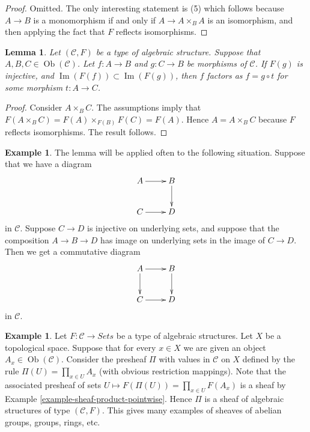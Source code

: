\documentclass{stacks-project}
\theoremstyle{plain}
\newtheorem{lemma}[subsection]{Lemma}
\theoremstyle{definition}
\newtheorem{example}[subsection]{Example}
\theoremstyle{remark}
\numberwithin{equation}{subsection}
\def\Ob{\mathop{\mathrm{Ob}}\nolimits}
\def\Im{\mathop{\mathrm{Im}}}
\begin{document}
\begin{proof}
Omitted. The only interesting statement is (5) which
follows because $A \to B$ is a monomorphism if and only if
$A \to A \times_B A$ is an isomorphism, and then applying
the fact that $F$ reflects isomorphisms.
\end{proof}

\begin{lemma}
\label{lemma-image-contained-in}
Let $(\mathcal{C}, F)$ be a type of algebraic structure.
Suppose that $A, B, C \in \Ob(\mathcal{C})$.
Let $f : A \to B$ and $g : C \to B$ be morphisms of
$\mathcal{C}$. If $F(g)$ is injective, and
$\Im(F(f)) \subset \Im(F(g))$, then
$f$ factors as $f = g \circ t$ for some morphism
$t : A \to C$.
\end{lemma}

\begin{proof}
Consider $A \times_B C$. The assumptions imply that
$F(A \times_B C) = F(A) \times_{F(B)} F(C) = F(A)$.
Hence $A = A \times_B C$ because $F$ reflects isomorphisms.
The result follows.
\end{proof}

\begin{example}
\label{example-application-lemma-image-contained-in}
The lemma will be applied often to the following situation.
Suppose that we have a diagram
$$
\xymatrix{
A \ar[r] & B \ar[d] \\
C \ar[r] & D
}
$$
in $\mathcal{C}$. Suppose $C \to D$ is injective on underlying
sets, and suppose that the composition $A \to B \to D$ has
image on underlying sets in the image of $C \to D$.
Then we get a commutative diagram
$$
\xymatrix{
A \ar[r] \ar[d] & B \ar[d] \\
C \ar[r] & D
}
$$
in $\mathcal{C}$.
\end{example}

\begin{example}
\label{example-sheaf-product-pointwise-algebraic-structure}
Let $F : \mathcal{C} \to \textit{Sets}$ be a
type of algebraic structures.
Let $X$ be a topological space. Suppose that
for every $x \in X$ we are given an object
$A_x \in \Ob(\mathcal{C})$. Consider the presheaf
$\Pi$ with values in $\mathcal{C}$ on $X$ defined by the rule
$\Pi(U) = \prod_{x \in U} A_x$ (with obvious restriction
mappings). Note that the associated presheaf of sets
$U \mapsto F(\Pi(U)) = \prod_{x \in U} F(A_x)$ is a sheaf
by Example \ref{example-sheaf-product-pointwise}.
Hence $\Pi$ is a sheaf of algebraic structures
of type $(\mathcal{C} , F)$. This gives many examples
of sheaves of abelian groups, groups, rings, etc.
\end{example}
\end{document}
